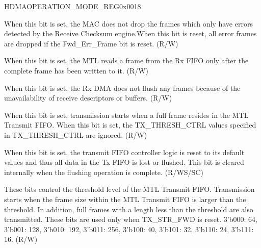 \begin{register}{H}{DMAOPERATION\_MODE\_REG}{0x0018}\label{regdesc:DMAOPERATION_MODEREG}
%
%
%
%
%
%
%
%
%
%
%
%
%
%
%
%
%
%
%
%
%
\regnewline%
\begin{regdesc}\begin{reglist}
\item [DIS\_DROP\_TCPIP\_ERR\_FRAM] When this bit is set, the MAC does not drop the frames which only have errors detected by the Receive Checksum engine.When this bit is reset, all error frames are dropped if the Fwd\_Err\_Frame bit is reset. (R/W)
\item [RX\_STORE\_FORWARD] When this bit is set, the MTL reads a frame from the Rx FIFO only after the complete frame has been written to it. (R/W)
\item [DIS\_FLUSH\_RECV\_FRAMES] When this bit is set, the Rx DMA does not flush any frames because of the unavailability of receive descriptors or buffers. (R/W)
\item [TX\_STR\_FWD] When this bit is set, transmission starts when a full frame resides in the MTL Transmit FIFO. When this bit is set, the TX\_THRESH\_CTRL values specified in TX\_THRESH\_CTRL are ignored. (R/W)
\item [FLUSH\_TX\_FIFO] When this bit is set, the transmit FIFO controller logic is reset to its default values  and thus all data in the Tx FIFO is lost or flushed. This bit is cleared internally when the flushing operation is complete. (R/WS/SC)
\item [TX\_THRESH\_CTRL] These bits control the threshold level of the MTL Transmit FIFO. Transmission starts when the frame size within the MTL Transmit FIFO is larger than the threshold. In addition, full frames with a length less than the threshold are also transmitted. These bits are used only when TX\_STR\_FWD is reset. 3'b000: 64, 3'b001: 128,  3'b010: 192, 3'b011: 256, 3'b100: 40, 3'b101: 32, 3'b110: 24, 3'b111: 16. (R/W)

\end{reglist}
\end{regdesc}
\end{register}
